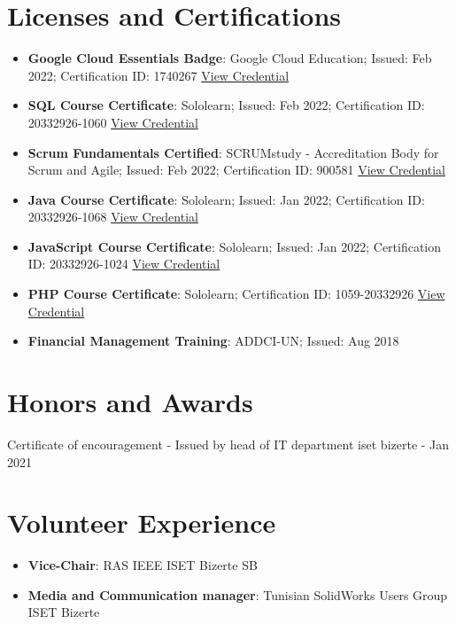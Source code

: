\documentclass[a4paper,20pt]{article}
\newcommand{\resumeItem}[2]{
  \item\small{
    \textbf{#1}{: #2 \vspace{-2pt}}
  }
}
\newcommand{\resumeSubItem}[2]{\resumeItem{#1}{#2}\vspace{-3pt}}
\newcommand{\resumeSubHeadingListStart}{\begin{itemize}[leftmargin=*]}
\newcommand{\resumeSubHeadingListEnd}{\end{itemize}}
\begin{document}
\section{Licenses and Certifications}
\resumeSubHeadingListStart
    \resumeSubItem{Google Cloud Essentials Badge}
        {Google Cloud Education; Issued: Feb 2022; Certification ID: 1740267}
        {\href{https://www.cloudskillsboost.google/public_profiles/b6cf5253-6dac-4b50-8a0d-7129daad930b/badges/1740267}{View Credential}}
    \resumeSubItem{SQL Course Certificate}
        {Sololearn; Issued: Feb 2022; Certification ID: 20332926-1060}
        {\href{https://www.sololearn.com/certificates/course/en/20332926/1060/landscape/png}{View Credential}}
    \resumeSubItem{Scrum Fundamentals Certified}
        {SCRUMstudy - Accreditation Body for Scrum and Agile; Issued: Feb 2022; Certification ID: 900581}
        {\href{https://c46e136a583f7e334124-ac22991740ab4ff17e21daf2ed577041.ssl.cf1.rackcdn.com/Certificate/ScrumFundamentalsCertified-MohamedYoussefChlendi-900581.pdf}{View Credential}}
    \resumeSubItem{Java Course Certificate}
        {Sololearn; Issued: Jan 2022; Certification ID: 20332926-1068}
        {\href{https://www.sololearn.com/certificates/course/en/20332926/1068/landscape/png}{View Credential}}
    \resumeSubItem{JavaScript Course Certificate}
        {Sololearn; Issued: Jan 2022; Certification ID: 20332926-1024}
        {\href{https://www.sololearn.com/certificates/course/en/20332926/1024/landscape/png}{View Credential}}
    \resumeSubItem{PHP Course Certificate}
        {Sololearn; Certification ID: 1059-20332926}
        {\href{https://www.sololearn.com/Certificate/1059-20332926/pdf/}{View Credential}}
    \resumeSubItem{Financial Management Training}
        {ADDCI-UN; Issued: Aug 2018}
\resumeSubHeadingListEnd


\section{Honors and Awards}
\begin{description}[font=$\bullet$]
\item {Certificate of encouragement - Issued by head of IT department iset bizerte - Jan 2021}
\end{description}

\vspace{-2pt}
\section{Volunteer Experience}
  \resumeSubHeadingListStart
	\resumeItem
    {Vice-Chair}
    {RAS IEEE ISET Bizerte SB}
    \resumeItem
    {Media and Communication manager}
    {Tunisian SolidWorks
Users Group ISET Bizerte}
   
\vspace{5pt}
\resumeSubHeadingListEnd
\end{document}
